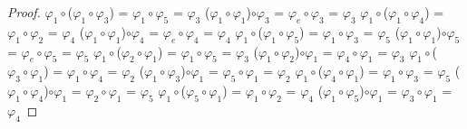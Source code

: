 \documentclass[10pt,a4paper,oneside]{article}
\begin{document}
\begin{proof}
				\newline
				\newline
				$\varphi_{1}\circ$($\varphi_{1}\circ\varphi_{3}$) = $\varphi_{1}\circ\varphi_{5}$ = $\varphi_{3}$
				\newline
				($\varphi_{1}\circ\varphi_{1}$)$\circ\varphi_{3}$ = $\varphi_{e}\circ\varphi_{3}$ = $\varphi_{3}$
				\newline
				\newline
				$\varphi_{1}\circ$($\varphi_{1}\circ\varphi_{4}$) = $\varphi_{1}\circ\varphi_{2}$ = $\varphi_{4}$
				\newline
				($\varphi_{1}\circ\varphi_{1}$)$\circ\varphi_{4}$ = $\varphi_{e}\circ\varphi_{4}$ = $\varphi_{4}$
				\newline
				\newline
				$\varphi_{1}\circ$($\varphi_{1}\circ\varphi_{5}$) = $\varphi_{1}\circ\varphi_{3}$ = $\varphi_{5}$
				\newline
				($\varphi_{1}\circ\varphi_{1}$)$\circ\varphi_{5}$ = $\varphi_{e}\circ\varphi_{5}$ = $\varphi_{5}$
				\newline
				\newline
				$\varphi_{1}\circ$($\varphi_{2}\circ\varphi_{1}$) = $\varphi_{1}\circ\varphi_{5}$ = $\varphi_{3}$
				\newline
				($\varphi_{1}\circ\varphi_{2}$)$\circ\varphi_{1}$ = $\varphi_{4}\circ\varphi_{1}$ = $\varphi_{3}$
				\newline
				\newline
				$\varphi_{1}\circ$($\varphi_{3}\circ\varphi_{1}$) = $\varphi_{1}\circ\varphi_{4}$ = $\varphi_{2}$
				\newline
				($\varphi_{1}\circ\varphi_{3}$)$\circ\varphi_{1}$ = $\varphi_{5}\circ\varphi_{1}$ = $\varphi_{2}$
				\newline
				\newline
				$\varphi_{1}\circ$($\varphi_{4}\circ\varphi_{1}$) = $\varphi_{1}\circ\varphi_{3}$ = $\varphi_{5}$
				\newline
				($\varphi_{1}\circ\varphi_{4}$)$\circ\varphi_{1}$ = $\varphi_{2}\circ\varphi_{1}$ = $\varphi_{5}$
				\newline
				\newline
				$\varphi_{1}\circ$($\varphi_{5}\circ\varphi_{1}$) = $\varphi_{1}\circ\varphi_{2}$ = $\varphi_{4}$
				\newline
				($\varphi_{1}\circ\varphi_{5}$)$\circ\varphi_{1}$ = $\varphi_{3}\circ\varphi_{1}$ = $\varphi_{4}$
				\newline

\end{proof}
\end{document}
